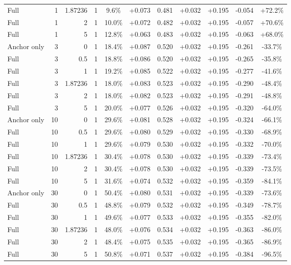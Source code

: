 \begin{table}[htbp]
\begin{tabular}{lrrrccccccc}
Full & 1 & 1.87236 & 1 & 9.6\% & +0.073 & 0.481 & +0.032 & +0.195 & -0.054 & +72.2\% \\
Full & 1 & 2 & 1 & 10.0\% & +0.072 & 0.482 & +0.032 & +0.195 & -0.057 & +70.6\% \\
Full & 1 & 5 & 1 & 12.8\% & +0.063 & 0.483 & +0.032 & +0.195 & -0.063 & +68.0\% \\
Anchor only & 3 & 0 & 1 & 18.4\% & +0.087 & 0.520 & +0.032 & +0.195 & -0.261 & -33.7\% \\
Full & 3 & 0.5 & 1 & 18.8\% & +0.086 & 0.520 & +0.032 & +0.195 & -0.265 & -35.8\% \\
Full & 3 & 1 & 1 & 19.2\% & +0.085 & 0.522 & +0.032 & +0.195 & -0.277 & -41.6\% \\
Full & 3 & 1.87236 & 1 & 18.0\% & +0.083 & 0.523 & +0.032 & +0.195 & -0.290 & -48.4\% \\
Full & 3 & 2 & 1 & 18.0\% & +0.082 & 0.523 & +0.032 & +0.195 & -0.291 & -48.8\% \\
Full & 3 & 5 & 1 & 20.0\% & +0.077 & 0.526 & +0.032 & +0.195 & -0.320 & -64.0\% \\
Anchor only & 10 & 0 & 1 & 29.6\% & +0.081 & 0.528 & +0.032 & +0.195 & -0.324 & -66.1\% \\
Full & 10 & 0.5 & 1 & 29.6\% & +0.080 & 0.529 & +0.032 & +0.195 & -0.330 & -68.9\% \\
Full & 10 & 1 & 1 & 29.6\% & +0.079 & 0.530 & +0.032 & +0.195 & -0.332 & -70.0\% \\
Full & 10 & 1.87236 & 1 & 30.4\% & +0.078 & 0.530 & +0.032 & +0.195 & -0.339 & -73.4\% \\
Full & 10 & 2 & 1 & 30.4\% & +0.078 & 0.530 & +0.032 & +0.195 & -0.339 & -73.5\% \\
Full & 10 & 5 & 1 & 31.6\% & +0.074 & 0.532 & +0.032 & +0.195 & -0.359 & -84.1\% \\
Anchor only & 30 & 0 & 1 & 50.4\% & +0.080 & 0.531 & +0.032 & +0.195 & -0.339 & -73.6\% \\
Full & 30 & 0.5 & 1 & 48.8\% & +0.079 & 0.532 & +0.032 & +0.195 & -0.349 & -78.7\% \\
Full & 30 & 1 & 1 & 49.6\% & +0.077 & 0.533 & +0.032 & +0.195 & -0.355 & -82.0\% \\
Full & 30 & 1.87236 & 1 & 48.0\% & +0.076 & 0.534 & +0.032 & +0.195 & -0.363 & -86.0\% \\
Full & 30 & 2 & 1 & 48.4\% & +0.075 & 0.535 & +0.032 & +0.195 & -0.365 & -86.9\% \\
Full & 30 & 5 & 1 & 50.8\% & +0.071 & 0.537 & +0.032 & +0.195 & -0.384 & -96.5\% \\

\end{tabular}
\end{table}
